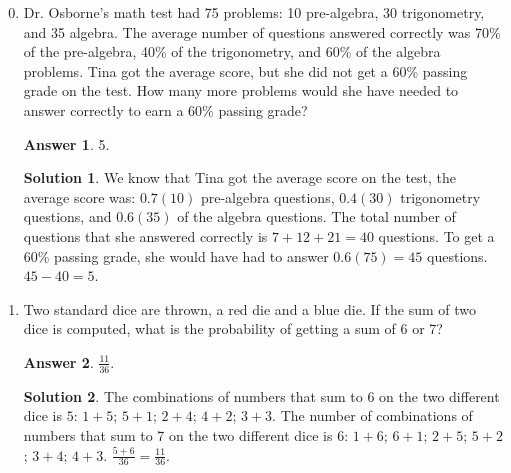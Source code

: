 \documentclass[11pt]{article}
\theoremstyle{definition}
\newtheorem*{solution}{Solution}
\newtheorem*{answer}{Answer}
\newcommand{\fdbox}[2]{\fbox{\sffamily\LARGE\vphantom y#1: \bfseries #2} \par\vspace{1em}} %
\begin{document}
\newcommand{\logo}{%
\begin{minipage}[b]{22em}
\centering\noindent
\\[0.5em]
\begin{minipage}[t][4em][t]{12em} \centering
{\huge \bfseries ${\bf 26^{\text{th}}}$ TJIMO } \\
\textsc{\large Alexandria, Virginia}
\end{minipage}
\end{minipage}
\vspace*{-0.05em}
}
\newcommand{\sevenpoints}{}
\newcommand{\righthead}{\fdbox{Round}{Orienteering Solutions}}

\begin{enumerate}
\setcounter{enumi}{-1}

\item Dr. Osborne's math test had 75 problems: 10 pre-algebra, 30 trigonometry, and 35 algebra. The average number of questions answered correctly was 70\% of the pre-algebra, 40\% of the trigonometry, and 60\% of the algebra problems. Tina got the average score, but she did not get a 60\% passing grade on the test. How many more problems would she have needed to answer correctly to earn a 60\% passing grade?
\begin{answer}
5.
\end{answer}

\begin{solution} We know that Tina got the average score on the test, the average score was: $0.7(10)$ pre-algebra questions, $0.4(30)$ trigonometry questions, and $0.6(35)$ of the algebra questions. The total number of questions that she answered correctly is $7+12+21=40$ questions. To get a 60\% passing grade, she would have had to answer $0.6(75) = 45$ questions. $45-40 = 5$.
\end{solution}

\item Two standard dice are thrown, a red die and a blue die. If the sum of two dice is computed, what is the probability of getting a sum of 6 or 7?
\begin{answer}
$\frac{11}{36}$.
\end{answer}
\begin{solution}
The combinations of numbers that sum to 6 on the two different dice is $5$: $1+5$; $5+1$; $2+4$; $4+2$; $3+3$. The number of combinations of numbers that sum to 7 on the two different dice is $6$: $1+6$; $6+1$; $2+5$; $5+2$; $3+4$; $4+3$. $\frac{5+6}{36} = \frac{11}{36}$.
\end{solution}


\end{enumerate}
\end{document}
